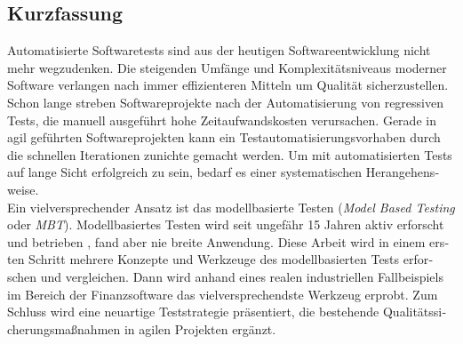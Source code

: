 
\cleardoublepage
{}


%

\begin{otherlanguage}{ngerman}

\chapter*{Kurzfassung}

Automatisierte Softwaretests sind aus der heutigen Softwareentwicklung nicht mehr wegzudenken. Die steigenden Umfänge und Komplexitätsniveaus moderner Software verlangen nach immer effizienteren Mitteln um Qualität sicherzustellen. Schon lange streben Softwareprojekte nach der Automatisierung von regressiven Tests, die manuell ausgeführt hohe Zeitaufwandskosten verursachen. Gerade in agil geführten Softwareprojekten kann ein Testautomatisierungsvorhaben durch die schnellen Iterationen zunichte gemacht werden. Um mit automatisierten Tests auf lange Sicht erfolgreich zu sein, bedarf es einer systematischen Herangehensweise.\\

Ein vielversprechender Ansatz ist das modellbasierte Testen (\textit{Model Based Testing} oder \textit{MBT}). Modellbasiertes Testen wird seit ungefähr 15 Jahren aktiv erforscht und betrieben \cite{utting_practical_2007}, fand aber nie breite Anwendung. Diese Arbeit wird in einem ersten Schritt mehrere Konzepte und Werkzeuge des modellbasierten Tests erforschen und vergleichen. Dann wird anhand eines realen industriellen Fallbeispiels im Bereich der Finanzsoftware das vielversprechendste Werkzeug erprobt. Zum Schluss wird eine neuartige Teststrategie präsentiert, die bestehende Qualitätssicherungsmaßnahmen in agilen Projekten ergänzt.\\


\end{otherlanguage}
